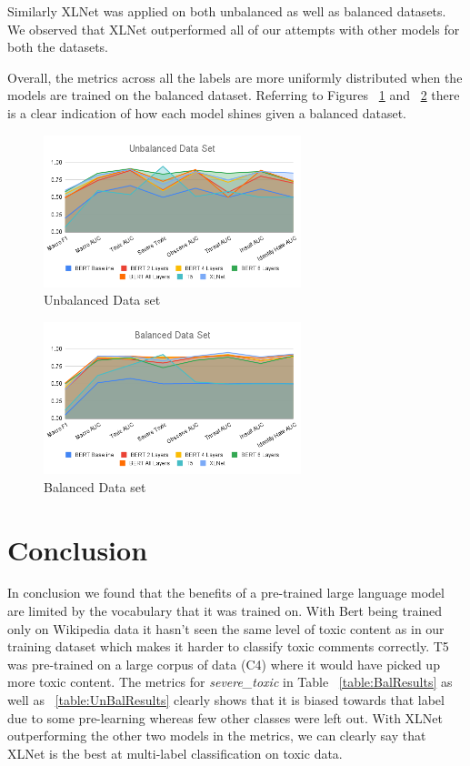 \documentclass[11pt,a4paper]{article}
\begin{document}
Similarly XLNet was applied on both unbalanced as well as balanced datasets. We observed that XLNet outperformed all of our attempts with other models for both the datasets. 

Overall, the metrics across all the labels are more uniformly distributed when the models are trained on the balanced dataset. Referring to Figures ~\ref{UnbalancedData} and ~\ref{BalancedData} there is a clear indication of how each model shines given a balanced dataset.

\begin{figure}[]
\centering
\includegraphics[width=75mm,scale=0.5]{Unbalanced Data Set.png}
\caption{Unbalanced Data set}
\label{UnbalancedData}
\end{figure}

\begin{figure}[]
\centering
\includegraphics[width=75mm,scale=0.5]{Balanced Data Set.png}
\caption{Balanced Data set}
\label{BalancedData}
\end{figure}
\FloatBarrier

\section{Conclusion}
In conclusion we found that the benefits of a pre-trained large language model are limited by the vocabulary that it was trained on. With Bert being trained only on Wikipedia data it hasn't seen the same level of toxic content as in our training dataset which makes it harder to classify toxic comments correctly.
T5 was pre-trained on a large corpus of data (C4) where it would have picked up more toxic content. The metrics for \emph{severe\_toxic} in Table ~\ref{table:BalResults} as well as ~\ref{table:UnBalResults} clearly shows that it is biased towards that label due to some pre-learning whereas few other classes were left out.
With XLNet outperforming the other two models in the metrics, we can clearly say that XLNet is the best at multi-label classification on toxic data.
\end{document}
